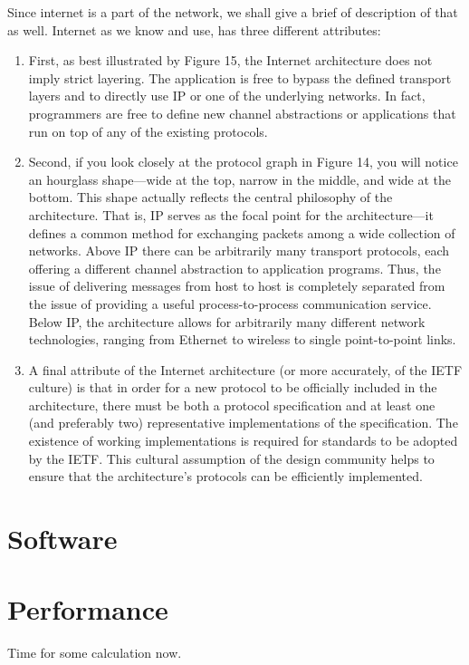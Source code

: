 \documentclass[12pt]{book}
\begin{document}
Since internet is a part of the network, we shall give a brief of description of that as well. Internet as we know and use, has three different attributes:
\begin{enumerate}
    \item First, as best illustrated by Figure 15, the Internet architecture does not imply strict layering. The application is free to bypass the defined transport layers and to directly use IP or one of the underlying networks. In fact, programmers are free to define new channel abstractions or applications that run on top of any of the existing protocols.
    
    \item Second, if you look closely at the protocol graph in Figure 14, you will notice an hourglass shape—wide at the top, narrow in the middle, and wide at the bottom. This shape actually reflects the central philosophy of the architecture. That is, IP serves as the focal point for the architecture—it defines a common method for exchanging packets among a wide collection of networks. Above IP there can be arbitrarily many transport protocols, each offering a different channel abstraction to application programs. Thus, the issue of delivering messages from host to host is completely separated from the issue of providing a useful process-to-process communication service. Below IP, the architecture allows for arbitrarily many different network technologies, ranging from Ethernet to wireless to single point-to-point links.
    \item A final attribute of the Internet architecture (or more accurately, of the IETF culture) is that in order for a new protocol to be officially included in the architecture, there must be both a protocol specification and at least one (and preferably two) representative implementations of the specification. The existence of working implementations is required for standards to be adopted by the IETF. This cultural assumption of the design community helps to ensure that the architecture’s protocols can be efficiently implemented.
\end{enumerate}

\section{Software}
\section{Performance}
Time for some calculation now.
\end{document}
